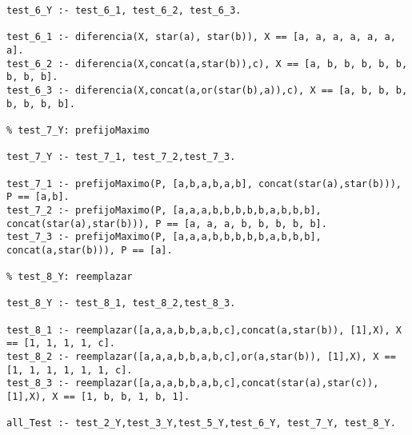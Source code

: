 \begin{verbatim}
test_6_Y :- test_6_1, test_6_2, test_6_3.

test_6_1 :- diferencia(X, star(a), star(b)), X == [a, a, a, a, a, a, a].
test_6_2 :- diferencia(X,concat(a,star(b)),c), X == [a, b, b, b, b, b, b, b, b].
test_6_3 :- diferencia(X,concat(a,or(star(b),a)),c), X == [a, b, b, b, b, b, b, b].

% test_7_Y: prefijoMaximo

test_7_Y :- test_7_1, test_7_2,test_7_3.

test_7_1 :- prefijoMaximo(P, [a,b,a,b,a,b], concat(star(a),star(b))), P == [a,b].
test_7_2 :- prefijoMaximo(P, [a,a,a,b,b,b,b,b,a,b,b,b], concat(star(a),star(b))), P == [a, a, a, b, b, b, b, b].
test_7_3 :- prefijoMaximo(P, [a,a,a,b,b,b,b,b,a,b,b,b], concat(a,star(b))), P == [a].

% test_8_Y: reemplazar

test_8_Y :- test_8_1, test_8_2,test_8_3.

test_8_1 :- reemplazar([a,a,a,b,b,a,b,c],concat(a,star(b)), [1],X), X == [1, 1, 1, 1, c].
test_8_2 :- reemplazar([a,a,a,b,b,a,b,c],or(a,star(b)), [1],X), X == [1, 1, 1, 1, 1, 1, c].
test_8_3 :- reemplazar([a,a,a,b,b,a,b,c],concat(star(a),star(c)), [1],X), X == [1, b, b, 1, b, 1].

all_Test :- test_2_Y,test_3_Y,test_5_Y,test_6_Y, test_7_Y, test_8_Y.

\end{verbatim}
